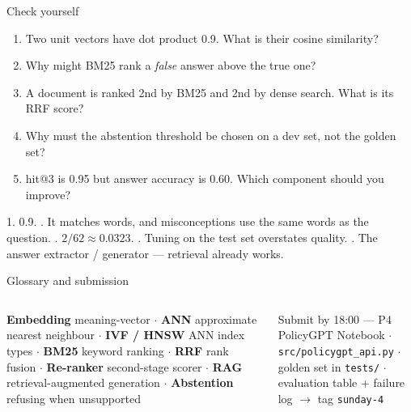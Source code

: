 \documentclass[aspectratio=169,11pt]{beamer}
\begin{document}
\begin{frame}{Check yourself}
\begin{enumerate}
\item Two unit vectors have dot product 0.9. What is their cosine similarity?
\item Why might BM25 rank a \emph{false} answer above the true one?
\item A document is ranked 2nd by BM25 and 2nd by dense search. What is its RRF score?
\item Why must the abstention threshold be chosen on a dev set, not the golden set?
\item hit@3 is 0.95 but answer accuracy is 0.60. Which component should you improve?
\end{enumerate}
\begin{bex}[Answers]
1. 0.9. . It matches words, and misconceptions use the same words as the question. . $2/62\approx0.0323$. . Tuning on the test set overstates quality. . The answer extractor / generator --- retrieval already works.
\end{bex}
\end{frame}

\begin{frame}{Glossary and submission}
\begin{columns}[T]
\begin{bdef}[Glossary]
\textbf{Embedding} meaning-vector $\cdot$ \textbf{ANN} approximate nearest neighbour $\cdot$ \textbf{IVF / HNSW} ANN index types $\cdot$ \textbf{BM25} keyword ranking $\cdot$ \textbf{RRF} rank fusion $\cdot$ \textbf{Re-ranker} second-stage scorer $\cdot$ \textbf{RAG} retrieval-augmented generation $\cdot$ \textbf{Abstention} refusing when unsupported
\end{bdef}
\begin{block}{Submit by 18:00 --- P4 PolicyGPT}
Notebook $\cdot$ \texttt{src/policygpt\_api.py} $\cdot$ golden set in \texttt{tests/} $\cdot$ evaluation table + failure log $\rightarrow$ tag \texttt{sunday-4}
\end{block}
\end{columns}
\end{frame}
\end{document}
